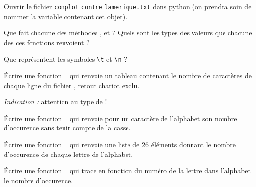 Ouvrir le fichier \texttt{complot$\_$contre$\_$lamerique.txt} dans python (on prendra soin de nommer la variable contenant cet objet). 

\question{} Que fait chacune des méthodes  ,  et  ? Quels sont les types des valeurs que chacune des ces fonctions renvoient ? 

\question{} Que représentent les symboles \texttt{\textbackslash t} et \texttt{\textbackslash n} ?


\question{} \'Ecrire une fonction \python\  qui renvoie un tableau contenant le nombre de caractères de chaque ligne du fichier , retour chariot exclu. 

\emph{Indication :} attention au type de  !

\question{} \'Ecrire une fonction \python\  qui renvoie pour un caractère de l'alphabet son nombre d'occurence sans tenir compte de la casse.

\question{} \'Ecrire une fonction \python\  qui renvoie une liste de 26 éléments donnant le nombre d'occurence de chaque lettre de l'alphabet.

\question{ } \'Ecrire une fonction \python\  qui trace en fonction du numéro de la lettre dans l'alphabet le nombre d'occurence.
